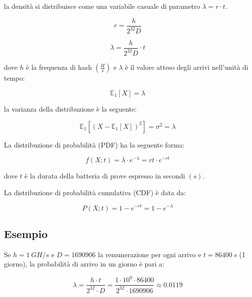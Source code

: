 \documentclass{article}
\begin{document}
la densità si distribuisce come una variabile casuale di parametro $\lambda = r \cdot t$.

\begin{equation}
    r = \frac{h}{2^{32}D} \label{rate}
\end{equation}

\begin{equation}
    \lambda = \frac{h}{2^{32}D} \cdot t \label{lambda}
\end{equation}

dove $h$ è la frequenza di hash $(\frac{H}{s})$ e $\lambda$ è il valore atteso degli arrivi nell'unità di tempo:

\begin{equation}
    \mathbb{E}_{1}[X] = \lambda \label{E_lambda}
\end{equation}

la varianza della distribuzione è la seguente:

\begin{equation}
    \mathbb{E}_{1}[ ( X - \mathbb{E}_{1}[X] )^2 ] = \sigma^{2} = \lambda \label{sigma2_lambda}
\end{equation}

La distribuzione di probabilità (PDF) ha la seguente forma:

\begin{equation}
    f(X; t) = \lambda \cdot e^{-\lambda} = rt \cdot e^{-rt}
\end{equation}

dove $t$ è la durata della batteria di prove espresso in  secondi $(s)$.

La distribuzione di probabilità cumulativa (CDF) è data da:

\begin{equation}
    P(X; t) = 1 - e^{-rt} = 1 - e^{-\lambda} \label{eq:CDF}
\end{equation}

\subsection{Esempio}

Se $h = 1 \ GH/s$ e $D = 1690906$ la remunerazione per ogni arrivo e $t = 86400 \ s$ (1 giorno), la probabilità di arrivo in un giorno è pari a:

\begin{equation}
    \lambda = \frac{h \cdot t}{2^{32} \cdot D} = \frac{1 \cdot 10^{9} \cdot 86400}{2^{32} \cdot 1690906} \approx 0.0119
\end{equation}
\end{document}
